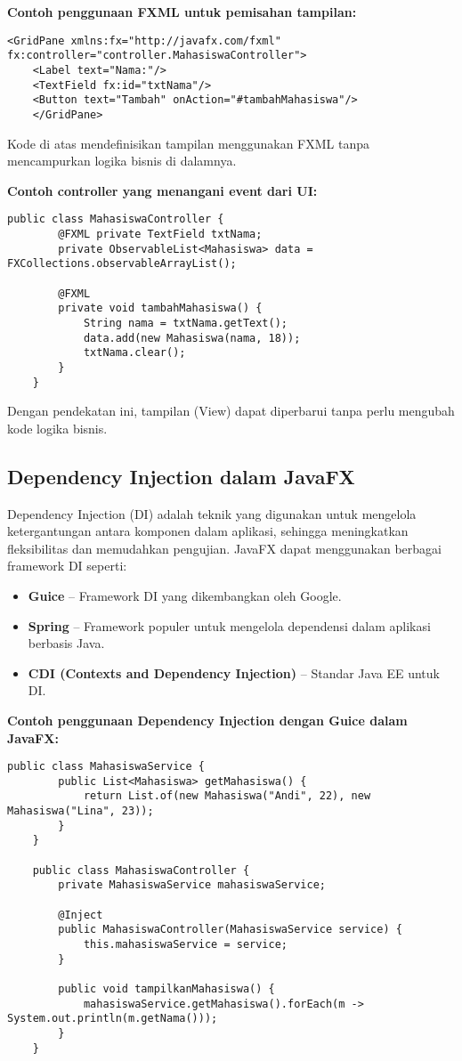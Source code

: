 \textbf{Contoh penggunaan FXML untuk pemisahan tampilan:}

\begin{lstlisting}[style=XmlStyle, caption=Contoh file FXML]
	<GridPane xmlns:fx="http://javafx.com/fxml" fx:controller="controller.MahasiswaController">
	<Label text="Nama:"/>
	<TextField fx:id="txtNama"/>
	<Button text="Tambah" onAction="#tambahMahasiswa"/>
	</GridPane>
\end{lstlisting}

Kode di atas mendefinisikan tampilan menggunakan FXML tanpa mencampurkan logika bisnis di dalamnya.

\textbf{Contoh controller yang menangani event dari UI:}

\begin{lstlisting}[style=JavaStyle, caption=Menangani aksi tombol dalam JavaFX]
	public class MahasiswaController {
		@FXML private TextField txtNama;
		private ObservableList<Mahasiswa> data = FXCollections.observableArrayList();
		
		@FXML
		private void tambahMahasiswa() {
			String nama = txtNama.getText();
			data.add(new Mahasiswa(nama, 18));
			txtNama.clear();
		}
	}
\end{lstlisting}

Dengan pendekatan ini, tampilan (View) dapat diperbarui tanpa perlu mengubah kode logika bisnis.

\subsection{Dependency Injection dalam JavaFX}

Dependency Injection (DI) adalah teknik yang digunakan untuk mengelola ketergantungan antara komponen dalam aplikasi, sehingga meningkatkan fleksibilitas dan memudahkan pengujian. JavaFX dapat menggunakan berbagai framework DI seperti:
\begin{itemize}
	\item \textbf{Guice} – Framework DI yang dikembangkan oleh Google.
	\item \textbf{Spring} – Framework populer untuk mengelola dependensi dalam aplikasi berbasis Java.
	\item \textbf{CDI (Contexts and Dependency Injection)} – Standar Java EE untuk DI.
\end{itemize}

\textbf{Contoh penggunaan Dependency Injection dengan Guice dalam JavaFX:}

\begin{lstlisting}[style=JavaStyle, caption=Contoh implementasi Dependency Injection dengan Guice]
	public class MahasiswaService {
		public List<Mahasiswa> getMahasiswa() {
			return List.of(new Mahasiswa("Andi", 22), new Mahasiswa("Lina", 23));
		}
	}
	
	public class MahasiswaController {
		private MahasiswaService mahasiswaService;
		
		@Inject
		public MahasiswaController(MahasiswaService service) {
			this.mahasiswaService = service;
		}
		
		public void tampilkanMahasiswa() {
			mahasiswaService.getMahasiswa().forEach(m -> System.out.println(m.getNama()));
		}
	}
\end{lstlisting}

